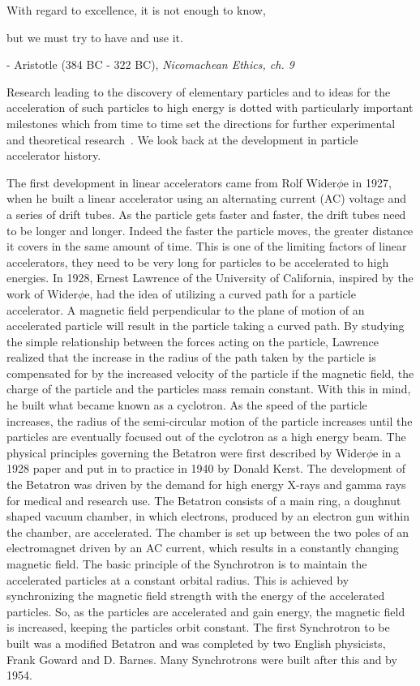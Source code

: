 \centerline{With regard to excellence, it is not enough to know,} 
\centerline{but we must try to have and use it.}
\centerline{- Aristotle (384 BC - 322 BC), \textit{Nicomachean Ethics, ch. 9}}

\vspace{3ex}
Research leading to the discovery of elementary particles and to ideas for the acceleration of such particles to high energy is dotted with particularly important milestones which from time to time set the directions for further experimental and theoretical research~\cite{wiedemann_particle_2015}. We look back at the development in particle accelerator history.

The first development in linear accelerators came from Rolf Wider$\phi$e in 1927, when he built a linear accelerator using an alternating current (AC) voltage and a series of drift tubes. As the particle gets faster and faster, the drift tubes need to be longer and longer. Indeed the faster the particle moves, the greater distance it covers in the same amount of time. This is one of the limiting factors of linear accelerators, they need to be very long for particles to be accelerated to high energies. In 1928, Ernest Lawrence of the University of California, inspired by the work of Wider$\phi$e, had the idea of utilizing a curved path for a particle accelerator. A magnetic field perpendicular to the plane of motion of an accelerated particle will result in the particle taking a curved path. By studying the simple relationship between the forces acting on the particle, Lawrence realized that the increase in the radius of the path taken by the particle is compensated for by the increased velocity of the particle if the magnetic field, the charge of the particle and the particles mass remain constant. With this in mind, he built what became known as a cyclotron. As the speed of the particle increases, the radius of the semi-circular motion of the particle increases until the particles are eventually focused out of the cyclotron as a high energy beam. The physical principles governing the Betatron were first described by Wider$\phi$e in a 1928 paper and put in to practice in 1940 by Donald Kerst. The development of the Betatron was driven by the demand for high energy X-rays and gamma rays for medical and research use. The Betatron consists of a main ring, a doughnut shaped vacuum chamber, in which electrons, produced by an electron gun within the chamber, are accelerated. The chamber is set up between the two poles of an electromagnet driven by an AC current, which results in a constantly changing magnetic field. The basic principle of the Synchrotron is to maintain the accelerated particles at a constant orbital radius. This is achieved by synchronizing the magnetic field strength with the energy of the accelerated particles. So, as the particles are accelerated and gain energy, the magnetic field is increased, keeping the particles orbit constant. The first Synchrotron to be built was a modified Betatron and was completed by two English physicists, Frank Goward and D. Barnes. Many Synchrotrons were built after this and by 1954.~\cite{_accelerators_????}

